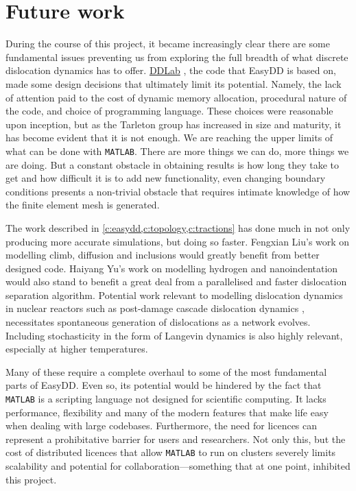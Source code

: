 \chapter{Future work}
\label{c:future}

During the course of this project, it became increasingly clear there are some fundamental issues preventing us from exploring the full breadth of what discrete dislocation dynamics has to offer. \href{http://micro.stanford.edu/wiki/M01_How_to_Obtain_and_Run_DDLab}{DDLab} \cite{ddlab}, the code that EasyDD is based on, made some design decisions that ultimately limit its potential. Namely, the lack of attention paid to the cost of dynamic memory allocation, procedural nature of the code, and choice of programming language. These choices were reasonable upon inception, but as the Tarleton group has increased in size and maturity, it has become evident that it is not enough. We are reaching the upper limits of what can be done with \texttt{MATLAB}. There are more things we can do, more things we are doing. But a constant obstacle in obtaining results is how long they take to get and how difficult it is to add new functionality, even changing boundary conditions presents a non-trivial obstacle that requires intimate knowledge of how the finite element mesh is generated.

The work described in \cref{c:easydd,c:topology,c:tractions} has done much in not only producing more accurate simulations, but doing so faster. Fengxian Liu's work on modelling climb, diffusion and inclusions would greatly benefit from better designed code. Haiyang Yu's work on modelling hydrogen \cite{YU2018} and nanoindentation would also stand to benefit a great deal from a parallelised and faster dislocation separation algorithm. Potential work relevant to modelling dislocation dynamics in nuclear reactors such as post-damage cascade dislocation dynamics \cite{sand2014radiation}, necessitates spontaneous generation of dislocations as a network evolves. Including stochasticity in the form of Langevin dynamics \cite{li2019diffusion} is also highly relevant, especially at higher temperatures.

Many of these require a complete overhaul to some of the most fundamental parts of EasyDD. Even so, its potential would be hindered by the fact that \texttt{MATLAB} is a scripting language not designed for scientific computing. It lacks performance, flexibility and many of the modern features that make life easy when dealing with large codebases. Furthermore, the need for licences can represent a prohibitative barrier for users and researchers. Not only this, but the cost of distributed licences that allow \texttt{MATLAB} to run on clusters severely limits scalability and potential for collaboration---something that at one point, inhibited this project.

